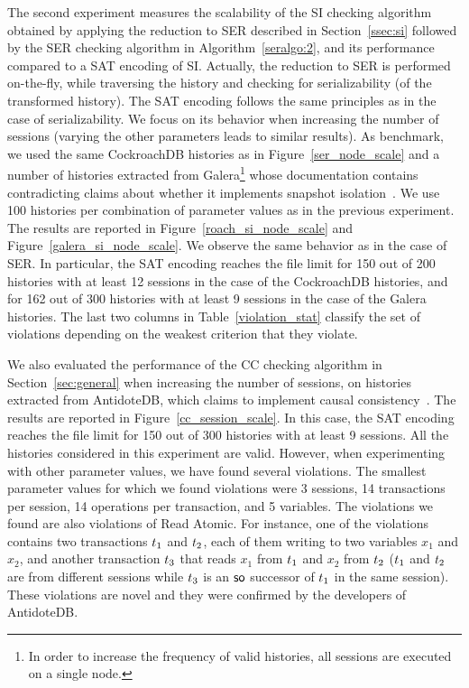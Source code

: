 The second experiment measures the scalability of the SI checking algorithm obtained by applying the reduction to SER described in Section~\ref{ssec:si} followed by the SER checking algorithm in Algorithm~\ref{seralgo:2}, and its performance compared to a SAT encoding of SI. Actually, the reduction to SER is performed on-the-fly, while traversing the history and checking for serializability (of the transformed history). The SAT encoding follows the same principles as in the case of serializability. We focus on its behavior when increasing the number of sessions (varying the other parameters leads to similar results). As benchmark, we used the same CockroachDB histories as in Figure~\ref{ser_node_scale} and a number of histories extracted from Galera\footnote{In order to increase the frequency of valid histories, all sessions are executed on a single node.} whose documentation contains contradicting claims about whether it implements snapshot isolation~\cite{galera-claim,galera-notclaim}. We use 100 histories per combination of parameter values as in the previous experiment. The results are reported in Figure~\ref{roach_si_node_scale} and Figure~\ref{galera_si_node_scale}. We observe the same behavior as in the case of SER. In particular, the SAT encoding reaches the file limit for 150 out of 200 histories with at least 12 sessions in the case of the CockroachDB histories, and for 162 out of 300 histories with at least 9 sessions in the case of the Galera histories. The last two columns in Table~\ref{violation_stat} classify the set of violations depending on the weakest criterion that they violate.

We also evaluated the performance of the CC checking algorithm in Section~\ref{sec:general} when increasing the number of sessions, on histories extracted from AntidoteDB, which claims to implement causal consistency~\cite{antidote-claim}. The results are reported in Figure~\ref{cc_session_scale}. In this case, the SAT encoding reaches the file limit for 150 out of 300 histories with at least 9 sessions. All the histories considered in this experiment are valid. However, when experimenting with other parameter values, we have found several violations. The smallest parameter values for which we found violations were 3 sessions, 14 transactions per session, 14 operations per transaction, and 5 variables. The violations we found are also violations of Read Atomic. For instance, one of the violations contains two transactions ${t}_1$ and ${t}_2$, each of them writing to two variables $x_1$ and $x_2$, and another transaction ${t}_3$ that reads $x_1$ from ${t}_1$ and $x_2$ from ${t}_2$ (${t}_1$ and ${t}_2$ are from different sessions while ${t}_3$ is an $\mathsf{so}$ successor of ${t}_1$ in the same session). These violations are novel and they were confirmed by the developers of AntidoteDB.

